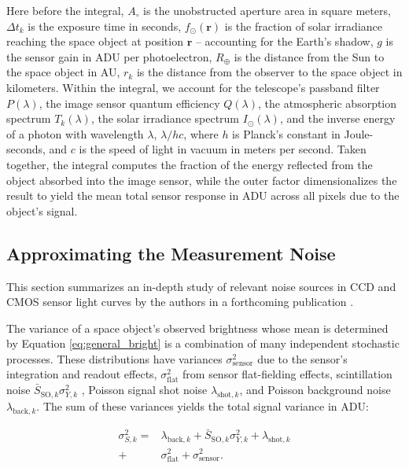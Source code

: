\documentclass[a4paper,twocolumn]{spaceDebrisC} %
\newcommand{\vctr}[1]{\bm{#1}}
\begin{document}
Here before the integral, $A_\circ$ is the unobstructed aperture area in square meters, $\Delta t_k$ is the exposure time in seconds, $f_\odot(\vctr{r})$ is the fraction of solar irradiance reaching the space object at position $\vctr{r}$ -- accounting for the Earth's shadow, $g$ is the sensor gain in ADU per photoelectron, $R_\oplus$ is the distance from the Sun to the space object in AU, $r_k$ is the distance from the observer to the space object in kilometers. Within the integral, we account for the telescope's passband filter $P(\lambda)$, the image sensor quantum efficiency $Q(\lambda)$, the atmospheric absorption spectrum $T_k(\lambda)$, the solar irradiance spectrum $I_\odot(\lambda)$, and the inverse energy of a photon with wavelength $\lambda$, $\lambda / hc$, where $h$ is Planck's constant in Joule-seconds, and $c$ is the speed of light in vacuum in meters per second. Taken together, the integral computes the fraction of the energy reflected from the object absorbed into the image sensor, while the outer factor dimensionalizes the result to yield the mean total sensor response in ADU across all pixels due to the object's signal.

\subsection{Approximating the Measurement Noise}

This section summarizes an in-depth study of relevant noise sources in CCD and CMOS sensor light curves by the authors in a forthcoming publication \cite{robinson2025twin}.

The variance of a space object's observed brightness whose mean is determined by Equation \ref{eq:general_bright} is a combination of many independent stochastic processes. These distributions have variances $\sigma^2_\text{sensor}$ due to the sensor's integration and readout effects, $\sigma^2_\text{flat}$ from sensor flat-fielding effects, scintillation noise $\bar{S}_{\text{SO},k} \sigma^2_{Y,k}$ \cite{osborn2015}, Poisson signal shot noise $\lambda_{\text{shot},k}$, and Poisson background noise $\lambda_{\text{back},k}$. The sum of these variances yields the total signal variance in ADU:

\begin{equation} \label{eq:sigma_total}
  \begin{split}
  \sigma^2_{S,k} = &\lambda_{\text{back},k} + \bar{S}_{\text{SO},k} \sigma^2_{Y,k} + \lambda_{\text{shot},k} \\ + &\sigma^2_\text{flat} + \sigma^2_\text{sensor}.
  \end{split}
\end{equation}
\end{document}
